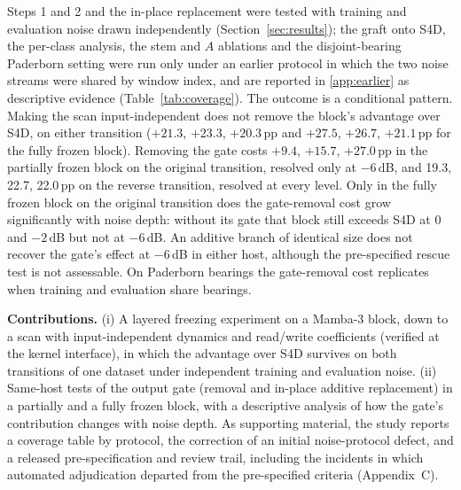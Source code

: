 Steps 1 and 2 and the in-place replacement were tested with training and evaluation noise drawn independently (Section~\ref{sec:results}); the graft onto S4D, the per-class analysis, the stem and $A$ ablations and the disjoint-bearing Paderborn setting were run only under an earlier protocol in which the two noise streams were shared by window index, and are reported in \ref{app:earlier} as descriptive evidence (Table~\ref{tab:coverage}). The outcome is a conditional pattern. Making the scan input-independent does not remove the block's advantage over S4D, on either transition ($+21.3$, $+23.3$, $+20.3$\,pp and $+27.5$, $+26.7$, $+21.1$\,pp for the fully frozen block). Removing the gate costs $+9.4$, $+15.7$, $+27.0$\,pp in the partially frozen block on the original transition, resolved only at $-6$\,dB, and 19.3, 22.7, 22.0\,pp on the reverse transition, resolved at every level. Only in the fully frozen block on the original transition does the gate-removal cost grow significantly with noise depth: without its gate that block still exceeds S4D at $0$ and $-2$\,dB but not at $-6$\,dB. An additive branch of identical size does not recover the gate's effect at $-6$\,dB in either host, although the pre-specified rescue test is not assessable. On Paderborn bearings the gate-removal cost replicates when training and evaluation share bearings.

\textbf{Contributions.} (i) A layered freezing experiment on a Mamba-3 block, down to a scan with input-independent dynamics and read/write coefficients (verified at the kernel interface), in which the advantage over S4D survives on both transitions of one dataset under independent training and evaluation noise. (ii) Same-host tests of the output gate (removal and in-place additive replacement) in a partially and a fully frozen block, with a descriptive analysis of how the gate's contribution changes with noise depth. As supporting material, the study reports a coverage table by protocol, the correction of an initial noise-protocol defect, and a released pre-specification and review trail, including the incidents in which automated adjudication departed from the pre-specified criteria (Appendix~C).
